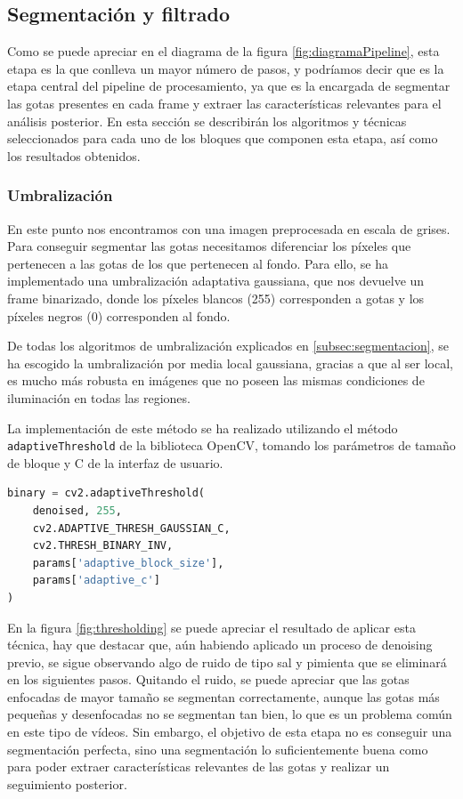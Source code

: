 \subsection{Segmentación y filtrado}

Como se puede apreciar en el diagrama de la figura \ref{fig:diagramaPipeline}, esta etapa es la que conlleva un mayor número de pasos, y podríamos decir que es la etapa central del pipeline de procesamiento, ya que es la encargada de segmentar las gotas presentes en cada frame y extraer las características relevantes para el análisis posterior. En esta sección se describirán los algoritmos y técnicas seleccionados para cada uno de los bloques que componen esta etapa, así como los resultados obtenidos.

\subsubsection{Umbralización}

En este punto nos encontramos con una imagen preprocesada en escala de grises. Para conseguir segmentar las gotas necesitamos diferenciar los píxeles que pertenecen a las gotas de los que pertenecen al fondo. Para ello, se ha implementado una umbralización adaptativa gaussiana, que nos devuelve un frame binarizado, donde los píxeles blancos (255) corresponden a gotas y los píxeles negros (0) corresponden al fondo. 

De todas los algoritmos de umbralización explicados en \ref{subsec:segmentacion}, se ha escogido la umbralización por media local gaussiana, gracias a que al ser local, es mucho más robusta en imágenes que no poseen las mismas condiciones de iluminación en todas las regiones.

La implementación de este método se ha realizado utilizando el método \texttt{adaptiveThreshold} de la biblioteca OpenCV, tomando los parámetros de tamaño de bloque y C de la interfaz de usuario.
\\
\begin{lstlisting}[language=Python, caption=Implementación de Umbralización Adaptativa Gaussiana en OpenCV]
binary = cv2.adaptiveThreshold(
    denoised, 255,
    cv2.ADAPTIVE_THRESH_GAUSSIAN_C,
    cv2.THRESH_BINARY_INV,
    params['adaptive_block_size'],
    params['adaptive_c']
)
\end{lstlisting}

En la figura \ref{fig:thresholding} se puede apreciar el resultado de aplicar esta técnica, hay que destacar que, aún habiendo aplicado un proceso de denoising previo, se sigue observando algo de ruido de tipo sal y pimienta que se eliminará en los siguientes pasos. Quitando el ruido, se puede apreciar que las gotas enfocadas de mayor tamaño se segmentan correctamente, aunque las gotas más pequeñas y desenfocadas no se segmentan tan bien, lo que es un problema común en este tipo de vídeos. Sin embargo, el objetivo de esta etapa no es conseguir una segmentación perfecta, sino una segmentación lo suficientemente buena como para poder extraer características relevantes de las gotas y realizar un seguimiento posterior.

